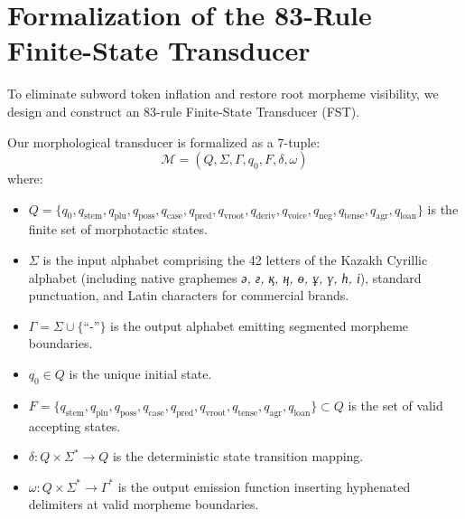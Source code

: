 \section{Formalization of the 83-Rule Finite-State Transducer}
\label{sec:ling_fst}

To eliminate subword token inflation and restore root morpheme visibility, we design and construct an 83-rule Finite-State Transducer (FST).

\begin{definition}
Our morphological transducer is formalized as a 7-tuple:
\begin{equation}
\label{eq:fst_7tuple}
\mathcal{M} = (Q, \Sigma, \Gamma, q_0, F, \delta, \omega)
\end{equation}
where:
\begin{itemize}
    \item $Q = \{q_0, q_{\text{stem}}, q_{\text{plu}}, q_{\text{poss}}, q_{\text{case}}, q_{\text{pred}}, q_{\text{vroot}}, q_{\text{deriv}}, q_{\text{voice}}, q_{\text{neg}}, q_{\text{tense}}, q_{\text{agr}}, q_{\text{loan}}\}$ is the finite set of morphotactic states.
    \item $\Sigma$ is the input alphabet comprising the 42 letters of the Kazakh Cyrillic alphabet (including native graphemes \textit{ә, ғ, қ, ң, ө, ұ, ү, һ, і}), standard punctuation, and Latin characters for commercial brands.
    \item $\Gamma = \Sigma \cup \{\text{``-''}\}$ is the output alphabet emitting segmented morpheme boundaries.
    \item $q_0 \in Q$ is the unique initial state.
    \item $F = \{q_{\text{stem}}, q_{\text{plu}}, q_{\text{poss}}, q_{\text{case}}, q_{\text{pred}}, q_{\text{vroot}}, q_{\text{tense}}, q_{\text{agr}}, q_{\text{loan}}\} \subset Q$ is the set of valid accepting states.
    \item $\delta: Q \times \Sigma^* \rightarrow Q$ is the deterministic state transition mapping.
    \item $\omega: Q \times \Sigma^* \rightarrow \Gamma^*$ is the output emission function inserting hyphenated delimiters at valid morpheme boundaries.
\end{itemize}
\end{definition}

